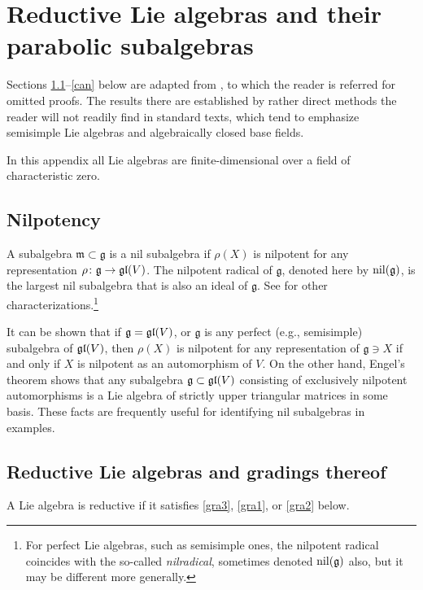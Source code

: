 \documentclass[leqno,12pt]{amsart} %
\newcommand\refreshpage{\newpage}
\newcommand\refreshpage{}
\begin{document}
\appendix
\refreshpage
\section{Reductive Lie algebras and their parabolic subalgebras}\label{lie_algebra_facts}
Sections \ref{nilpotency}--\ref{can} below are adapted from
\cite{Calderbank_Noppakaew_16}, to which the reader is referred for omitted proofs. The
results there are established by rather direct methods the reader will not readily find in
standard texts, which tend to emphasize semisimple Lie algebras and algebraically closed
base fields.

In this appendix all Lie algebras are finite-dimensional over a field of characteristic
zero.

\subsection{Nilpotency}\label{nilpotency}
A subalgebra ${\mathfrak m} \subset {\mathfrak g} $ is a {\df nil subalgebra} if $\rho(X)$
is nilpotent for any representation $\rho \colon {\mathfrak g} \rightarrow \mathfrak{gl}(V)$. The
{\df nilpotent radical} of ${\mathfrak g} $, denoted here by $\operatorname{\operatorname{nil}}({\mathfrak g})$, is the
largest nil subalgebra that is also an ideal of ${\mathfrak g} $. See
\cite{Calderbank_Noppakaew_16} for other characterizations.\footnote{For perfect Lie
  algebras, such as semisimple ones, the nilpotent radical coincides with the so-called
  {\em nilradical}, sometimes denoted $\operatorname{\operatorname{nil}}({\mathfrak g})$ also, but it may be different
  more generally.}

\begin{remark}
  It can be shown that if ${\mathfrak g}=\mathfrak{gl}(V)$, or ${\mathfrak g} $ is any perfect
  (e.g., semisimple) subalgebra of $\mathfrak{gl}(V)$, then $\rho(X)$ is nilpotent for any
  representation of ${\mathfrak g} \ni X$ if and only if $X$ is nilpotent as an
  automorphism of $V$. On the other hand, Engel's theorem shows that any subalgebra
  ${\mathfrak g} \subset \mathfrak{gl}(V)$ consisting of exclusively nilpotent automorphisms is a
  Lie algebra of strictly upper triangular matrices in some basis. These facts are
  frequently useful for identifying nil subalgebras in examples.
\end{remark}

\subsection{Reductive Lie algebras and gradings thereof}\label{par}
A Lie algebra is {\df reductive} if it satisfies \eqref{gra3}, \eqref{gra1}, or
\eqref{gra2} below.
\end{document}
